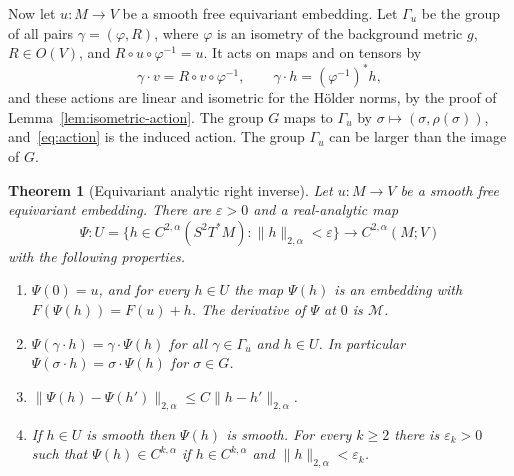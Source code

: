 \documentclass[11pt]{amsart}
\newtheorem{theorem}{Theorem}[section]
\theoremstyle{definition}
\newcommand{\cM}{\mathcal{M}}
\begin{document}
Now let $u\colon M\to V$ be a smooth free equivariant embedding. Let $\Gamma_u$ be the group of
all pairs $\gamma=(\varphi,R)$, where $\varphi$ is an isometry of the background metric $g$,
$R\in O(V)$, and $R\circ u\circ\varphi^{-1}=u$. It acts on maps and on tensors by
\[
\gamma\cdot v=R\circ v\circ\varphi^{-1},\qquad\gamma\cdot h=(\varphi^{-1})^*h ,
\]
and these actions are linear and isometric for the H\"older norms, by the proof of
Lemma~\ref{lem:isometric-action}. The group $G$ maps to $\Gamma_u$ by
$\sigma\mapsto(\sigma,\rho(\sigma))$, and~\eqref{eq:action} is the induced action. The group
$\Gamma_u$ can be larger than the image of $G$.

\begin{theorem}[Equivariant analytic right inverse]\label{thm:right-inverse-map}
Let $u\colon M\to V$ be a smooth free equivariant embedding. There are $\varepsilon>0$ and a
real-analytic map
\[
\Psi\colon U=\bigl\{h\in C^{2,\alpha}(S^2T^*M):\|h\|_{2,\alpha}<\varepsilon\bigr\}\to C^{2,\alpha}(M;V)
\]
with the following properties.
\begin{enumerate}[label=(\alph*)]
\item\label{ri:inverse} $\Psi(0)=u$, and for every $h\in U$ the map $\Psi(h)$ is an embedding
with $F(\Psi(h))=F(u)+h$. The derivative of $\Psi$ at $0$ is $\cM$.
\item\label{ri:equivariant} $\Psi(\gamma\cdot h)=\gamma\cdot\Psi(h)$ for all $\gamma\in\Gamma_u$
and $h\in U$. In particular $\Psi(\sigma\cdot h)=\sigma\cdot\Psi(h)$ for $\sigma\in G$.
\item\label{ri:lipschitz} $\|\Psi(h)-\Psi(h')\|_{2,\alpha}\le C\|h-h'\|_{2,\alpha}$.
\item\label{ri:regular} If $h\in U$ is smooth then $\Psi(h)$ is smooth. For every $k\ge2$ there is
$\varepsilon_k>0$ such that $\Psi(h)\in C^{k,\alpha}$ if $h\in C^{k,\alpha}$ and
$\|h\|_{2,\alpha}<\varepsilon_k$.
\end{enumerate}
\end{theorem}
\end{document}
